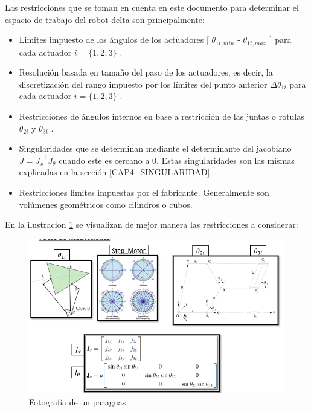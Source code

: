     Las restricciones que se toman en cuenta en este documento para determinar el espacio de trabajo del robot delta son principalmente: 
   
    \begin{itemize}
    	\item Limites impuesto de los ángulos de los actuadores [  \(  \theta _{1i,min} \)  -   \(  \theta _{1i,max} \)  ] para cada actuador  \( i= \{ 1,2,3 \}  \)  .\par
    
    	\item Resolución basada en tamaño del paso de los actuadores, es decir, la discretización del rango impuesto por los límites del punto anterior  \(  \Delta  \theta _{1i} \)  para cada actuador  \( i= \{ 1,2,3 \}  \) .\par
    
    	\item Restricciones de ángulos internos en base a restricción de las juntas o rotulas  \(  \theta _{2i} \)  y  \(  \theta _{3i} \) .\par
    
    	\item Singularidades que se determinan mediante el determinante del jacobiano  \( J=J_{x}^{-1}J_{ \theta } \)   cuando este es cercano a 0. Estas singularidades son las mismas explicadas en la sección \ref{CAP4_SINGULARIDAD}.
    	
    	\item Restricciones limites impuestas por el fabricante. Generalmente son volúmenes geométricos como cilindros o cubos.	
    	
    \end{itemize}
    
    
    En la ilustracion \ref{f:Cap4_ws_2} se visualizan de mejor manera las restricciones a considerar:
    
    
    \begin{figure}[htb]
        \centering
        \includegraphics[width=0.6\linewidth]{Main/Chapter4/Images4/cap4_ws_2.png}
        \caption{Fotografía de un paraguas}
        \label{f:Cap4_ws_2}
    \end{figure}   

